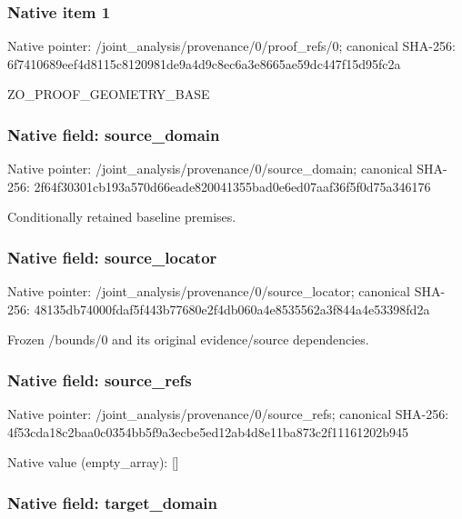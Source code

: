 \documentclass[10pt,a4paper]{article}
\begin{document}
\subsubsection{Native item 1}


Native pointer: /joint\_analysis/provenan\allowbreak{}ce/0/proof\_refs/0; canonical SHA-256: 6f7410689eef4d8115c81209\allowbreak{}81de9a4d9c8ec6a3e8665ae5\allowbreak{}9dc447f15d95fc2a


ZO\_PROOF\_GEOMETRY\_BASE


\subsubsection{Native field: source\_domain}


Native pointer: /joint\_analysis/provenan\allowbreak{}ce/0/source\_domain; canonical SHA-256: 2f64f30301cb193a570d66ea\allowbreak{}de820041355bad0e6ed07aaf\allowbreak{}36f5f0d75a346176


Conditionally retained baseline premises.


\subsubsection{Native field: source\_locator}


Native pointer: /joint\_analysis/provenan\allowbreak{}ce/0/source\_locator; canonical SHA-256: 48135db74000fdaf5f443b77\allowbreak{}680e2f4db060a4e8535562a3\allowbreak{}f844a4e53398fd2a


Frozen /bounds/0 and its original evidence/source dependencies.


\subsubsection{Native field: source\_refs}


Native pointer: /joint\_analysis/provenan\allowbreak{}ce/0/source\_refs; canonical SHA-256: 4f53cda18c2baa0c0354bb5f\allowbreak{}9a3ecbe5ed12ab4d8e11ba87\allowbreak{}3c2f11161202b945



Native value (empty\_array): []



\subsubsection{Native field: target\_domain}
\end{document}
